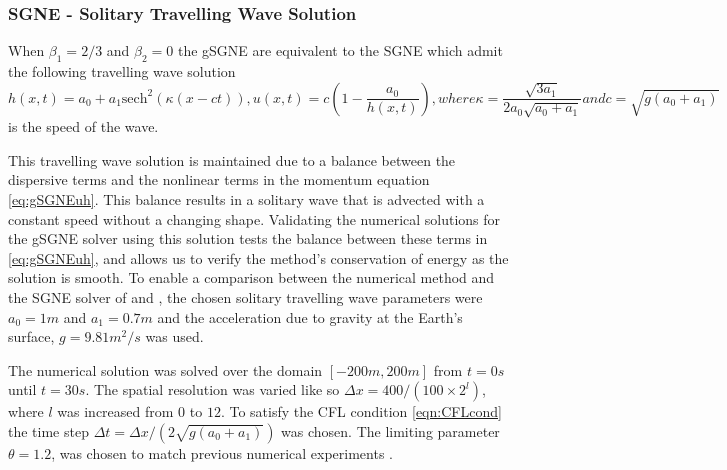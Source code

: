 \documentclass[10pt]{elsarticle}
\begin{document}
\subsubsection{SGNE - Solitary Travelling Wave Solution}
When $\beta_1 = 2/3$ and $\beta_2 = 0$ the gSGNE are equivalent to the SGNE which admit the following travelling wave solution \cite{El-etal-2006}
\begin{subequations}
	\begin{equation}
	h(x,t) = a_0 + a_1 \text{sech}^2\left( \kappa (x - ct) \right),
	\end{equation}
	\begin{equation}
	u(x,t) = c \left( 1- \dfrac{a_0}{h(x,t)} \right),
	\end{equation}
	where
	\begin{equation}
	\kappa = \dfrac{\sqrt{3a_1}}{2a_0 \sqrt{a_0 + a_1}}
	\end{equation}
	and
	\begin{equation}
	c = \sqrt{g\left(a_0 + a_1\right)}
	\label{eq:Sol_speed}
	\end{equation}
\end{subequations}
is the speed of the wave.

This travelling wave solution is maintained due to a balance between the dispersive terms and the nonlinear terms in the momentum equation \eqref{eq:gSGNEuh}. This balance results in a solitary wave that is advected with a constant speed without a changing shape. Validating the numerical solutions for the gSGNE solver using this solution tests the balance between these terms in \eqref{eq:gSGNEuh}, and allows us to verify the method's conservation of energy as the solution is smooth. To enable a comparison between the numerical method and the SGNE solver of \citet{Zoppou-etal-2017} and \citet{Pitt-2019}, the chosen solitary travelling wave parameters were $a_0 = 1m$ and $a_1 = 0.7m$ and the acceleration due to gravity at the Earth's surface, $g = 9.81 m^2/s$ was used.


The numerical solution was solved over the domain $\left[-200m,200m\right]$ from $t=0s$ until $t=30s$. The spatial resolution was varied like so $\Delta x = 400 / (100 \times 2^{l})$, where $l$ was increased from $0$ to $12$. To satisfy the CFL condition \eqref{eqn:CFLcond} the time step $\Delta t = \Delta x  / ( 2 \sqrt{g(a_0 + a_1)})$ was chosen. The limiting parameter $\theta = 1.2$, was chosen to match previous numerical experiments \cite{Zoppou-etal-2017,Pitt-2019}.
\end{document}
